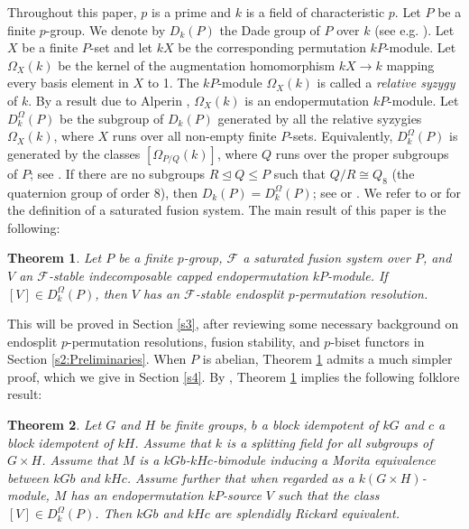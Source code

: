 \documentclass[preprint,12pt,3p]{elsarticle}
\newtheorem{theorem}{Theorem}[section]
\def\F{\mathcal{F}}
\begin{document}
Throughout this paper, $p$ is a prime and $k$ is a field of characteristic $p$. Let $P$ be a finite $p$-group. We denote by $D_k(P)$ the Dade group of $P$ over $k$ (see e.g. \cite[\S3]{Th07}). Let $X$ be a finite $P$-set and let $kX$ be the corresponding permutation $kP$-module. Let $\Omega_X(k)$ be the kernel of the augmentation homomorphism $kX\to k$ mapping every basis element in $X$ to 1. The $kP$-module $\Omega_X(k)$ is called a {\it relative syzygy} of $k$. By a result due to Alperin \cite{Alp01}, $\Omega_X(k)$ is an endopermutation $kP$-module.
Let $D_k^\Omega(P)$ be the subgroup of $D_k(P)$ generated by all the relative syzygies $\Omega_X(k)$, where $X$ runs over all non-empty finite $P$-sets. Equivalently, $D_k^\Omega(P)$ is generated by the classes $[\Omega_{P/Q}(k)]$, where $Q$ runs over the proper subgroups of $P$; see \cite[Lemma 5.2.3]{Bouc:relative syzygies}. If there are no subgroups $R\unlhd Q\leq P$ such that $Q/R\cong Q_8$ (the quaternion group of order $8$), then $D_k(P)=D_k^\Omega(P)$; see \cite[Theorem 9.5]{Bouc:The Dade group} or \cite[Theorems 13.2 and 13.3]{Th07}. We refer to \cite[Definition 2.2]{AKO} or \cite[Definition 8.1.6]{Lin18b} for the definition of a saturated fusion system. The main result of this paper is the following:

\begin{theorem}\label{theo:main}
Let $P$ be a finite $p$-group, $\F$ a saturated fusion system over $P$, and $V$ an $\F$-stable indecomposable capped endopermutation $kP$-module. If $[V]\in D_k^\Omega(P)$, then $V$ has an $\F$-stable endosplit $p$-permutation resolution.
\end{theorem}

This will be proved in Section \ref{s3}, after reviewing some necessary background on endosplit $p$-permutation resolutions, fusion stability, and $p$-biset functors in Section \ref{s2:Preliminaries}. When $P$ is abelian, Theorem \ref{theo:main} admits a much simpler proof, which we give in Section \ref{s4}. By \cite[Theorems 9.11.2, 9.11.5 (i)]{Lin18b}, Theorem \ref{theo:main} implies the following folklore result:

\begin{theorem}\label{theorem:folklore}
Let $G$ and $H$ be finite groups, $b$ a block idempotent of $kG$ and $c$ a block idempotent of $kH$. Assume that $k$ is a splitting field for all subgroups of $G\times H$. Assume that $M$ is a $kGb$-$kHc$-bimodule inducing a Morita equivalence between $kGb$ and $kHc$. Assume further that when regarded as a $k(G\times H)$-module, $M$ has an endopermutation $kP$-source $V$ such that the class $[V]\in D_k^\Omega(P)$. Then $kGb$ and $kHc$ are splendidly Rickard equivalent.
\end{theorem}
\end{document}

